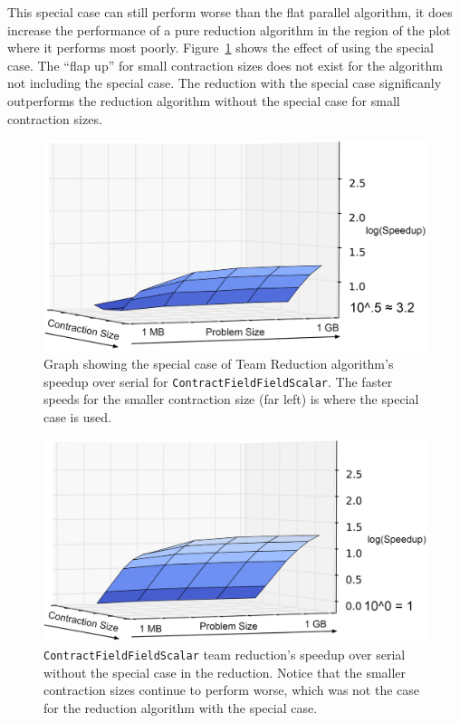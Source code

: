 This special case can still
perform worse than the flat parallel algorithm, it does increase 
the performance of a pure reduction algorithm in the region of the plot where it
performs most poorly. Figure~\ref{CFFSTeamReduceSpecialCaseGraph} shows the
effect of using the special case. The ``flap up'' for small contraction sizes
does not exist for the algorithm not including the special case. The reduction
with the special case significanly outperforms the reduction algorithm without
the special case for small contraction sizes.

\begin{figure}
    \centering
\includegraphics[width=5in]{ReductionSpecial2.png}
\caption[\texttt{ContractFieldFieldScalar} reduction special]{Graph showing the
    special case of Team Reduction algorithm's speedup over serial for
    \texttt{ContractFieldFieldScalar}.  The faster speeds for the smaller
contraction size (far left) is where the special case is used.}
\label{CFFSTeamReduceSpecialCaseGraph}
\end{figure}

\begin{figure}
    \centering
\includegraphics[width=5in]{ReductionNoSpecial2.png}
\caption[\texttt{ContractFieldFieldScalar} reduction no special]{\texttt{ContractFieldFieldScalar} team reduction's speedup
        over serial without the special case in the reduction. Notice that the
    smaller contraction sizes continue to perform worse, which was not the case
for the reduction algorithm with the special case.}
\label{CFFSTeamReduceNoSpecialCaseGraph}
\end{figure}

